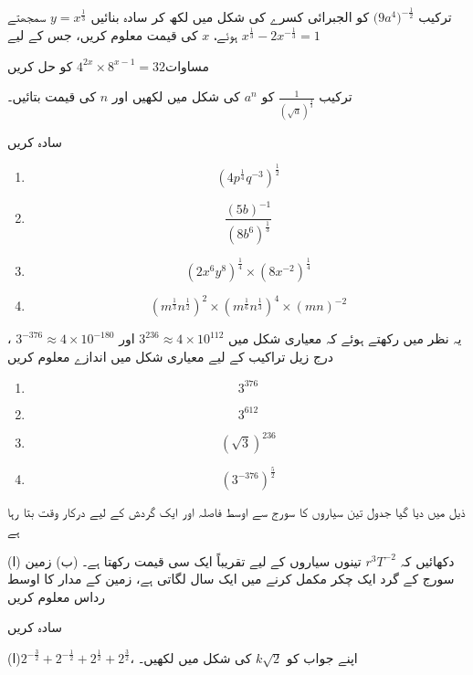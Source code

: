 
ترکیب \(\big(9a^{4}\big)^{-\frac{1}{2}}\)
کو الجبرائی کسرے کی شکل میں لکھ کر سادہ بنائیں
\(y=x^{\frac{1}{3}}\) سمجھتے ہوئے، \(x\) کی قیمت معلوم کریں، جس کے لیے \(x^{\frac{1}{3}}-2x^{-\frac{1}{3}}=1\)


مساوات\(4^{2x}\times 8^{x-1}=32\) کو حل کریں


ترکیب \(\frac{1}{(\sqrt{a})^\frac{4}{3}}\) کو \(a^n\) کی شکل میں لکھیں اور  \(n\) کی قیمت بتائیں۔


سادہ کریں
\begin{multicols}{4}
\begin{enumerate}[.a]
\item
\[(4p^{\frac{1}{4}}q^{-3})^{\frac{1}{2}}\]
\item
\[\frac{(5b)^{-1}}{(8b^{6})^{\frac{1}{3}}}\]
\item
\[(2x^{6}y^{8})^{\frac{1}{4}}\times (8x^{-2})^{\frac{1}{4}}\]
\item
\[(m^{\frac{1}{3}}n^{\frac{1}{2}})^2\times (m^{\frac{1}{6}}n^{\frac{1}{3}})^{4}\times(mn)^{-2}\]
\end{enumerate}
\end{multicols}

یہ نظر میں رکھتے ہوئے کہ معیاری شکل میں \(3^{236}\approx4\times10^{112}\) اور \(3^{-376}\approx4\times 10^{-180}\)
، درج زیل تراکیب کے لیے معیاری شکل میں اندازے معلوم کریں

\begin{multicols}{4}
\begin{enumerate}[.a]
\item
\[3^{376}\]
\item
\[3^{612}\]
\item
\[(\sqrt{3})^{236}\]
\item
\[(3^{-376})^{\frac{5}{2}}\]
\end{enumerate}
\end{multicols}


ذیل میں دیا گیا جدول تین سیاروں کا سورج سے اوسط فاصلہ اور ایک گردش کے لیے درکار وقت بتا رہا ہے

(ا) دکھائیں کہ 
\(r^{3}T^{-2}\) تینوں سیاروں کے لیے تقریباً ایک سی قیمت رکھتا ہے۔
(ب) زمین سورج کے گرد ایک چکر مکمل کرنے میں ایک سال لگاتی ہے، زمین کے مدار کا اوسط رداس معلوم کریں


سادہ کریں

(ا)\(2^{-\frac{3}{2}}+2^{-\frac{1}{2}}+2^{\frac{1}{2}}+2^{\frac{3}{2}}\)، اپنے جواب کو \(k\sqrt{2}\)
 کی شکل میں لکھیں۔

